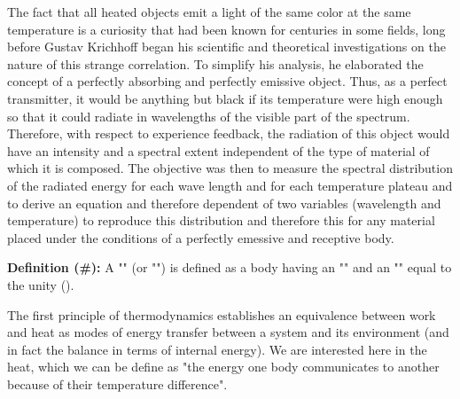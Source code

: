 	The fact that all heated objects emit a light of the same color at the same temperature is a curiosity that had been known for centuries in some fields, long before Gustav Krichhoff began his scientific and theoretical investigations on the nature of this strange correlation. To simplify his analysis, he elaborated the concept of a perfectly absorbing and perfectly emissive object. Thus, as a perfect transmitter, it would be anything but black if its temperature were high enough so that it could radiate in wavelengths of the visible part of the spectrum. Therefore, with respect to experience feedback, the radiation of this object would have an intensity and a spectral extent independent of the type of material of which it is composed. The objective was then to measure the spectral distribution of the radiated energy for each wave length and for each temperature plateau and to derive an equation and therefore dependent of two variables (wavelength and temperature) to reproduce this distribution and therefore this for any material placed under the conditions of a perfectly emessive and receptive body.
	
	\textbf{Definition (\#\mydef):} 
	A "" (or "") is defined as a body having an "" and an "" equal to the unity ().
	
	The first principle of thermodynamics establishes an equivalence between work and heat as modes of energy transfer between a system and its environment (and in fact the balance in terms of internal energy). We are interested here in the heat, which we can be define as "the energy one body communicates to another because of their temperature difference".

